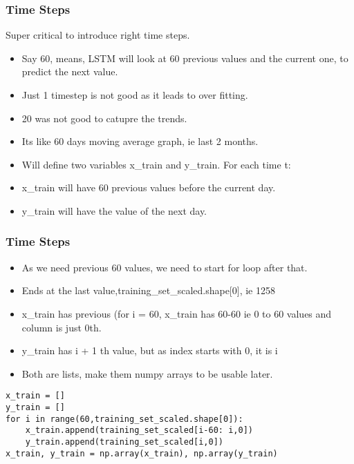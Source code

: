 \begin{frame}[fragile] \frametitle{Time Steps}
Super critical to introduce right time steps.
\begin{itemize}
\item Say 60, means, LSTM will look at 60 previous values and the current one, to predict the next value.
\item Just 1 timestep is not good as it leads to over fitting.
\item 20 was not good to catupre the trends. 
\item Its like 60 days moving average graph, ie last 2 months.
\item Will define two variables x\_train and y\_train. For each time t:
\item x\_train will have 60 previous values before the current day.
\item y\_train will have the value of the next day.
\end{itemize}
\end{frame}

\begin{frame}[fragile] \frametitle{Time Steps}
\begin{itemize}
\item As we need previous 60 values, we need to start for loop after that.
\item Ends at the last value,training\_set\_scaled.shape[0], ie 1258
\item x\_train has previous (for i = 60, x\_train has 60-60 ie 0 to 60 values and column is just 0th.
\item y\_train has i + 1 th value, but as index starts with 0, it is i
\item Both are lists, make them numpy arrays to be usable later.
\end{itemize}

\begin{lstlisting}
x_train = []
y_train = []
for i in range(60,training_set_scaled.shape[0]):
    x_train.append(training_set_scaled[i-60: i,0])
    y_train.append(training_set_scaled[i,0])
x_train, y_train = np.array(x_train), np.array(y_train)    
\end{lstlisting}
\end{frame}

